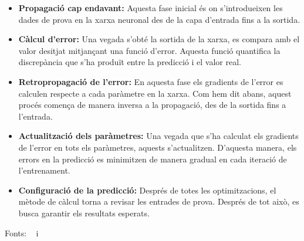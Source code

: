 \begin{itemize}

    \item \textbf{Propagació cap endavant: } Aquesta fase inicial és on s'introdueixen les dades de prova en la xarxa neuronal des de la capa d'entrada fins a la sortida.

    \item \textbf{Càlcul d'error: } Una vegada s'obté la sortida de la xarxa, es compara amb el valor desitjat mitjançant una funció d'error. Aquesta funció quantifica la discrepància que s'ha produït entre la predicció i el valor real.

    \item \textbf{Retropropagació de l'error: } En aquesta fase els gradients de l'error es calculen respecte a cada paràmetre en la xarxa. Com hem dit abans, aquest procés comença de manera inversa a la propagació, des de la sortida fins a l'entrada.

    \item \textbf{Actualització dels paràmetres: } Una vegada que s'ha calculat els gradients de l'error en tots els paràmetres, aquests s'actualitzen. D'aquesta manera, els errors en la predicció es minimitzen de manera gradual en cada iteració de l'entrenament.

    \item \textbf{Configuració de la predicció: } Després de totes les optimitzacions, el mètode de càlcul torna a revisar les entrades de prova. Després de tot això, es busca garantir els resultats esperats.

\end{itemize}

Fonts: ~\cite{valencia} i~\cite{Retropropagacio}
